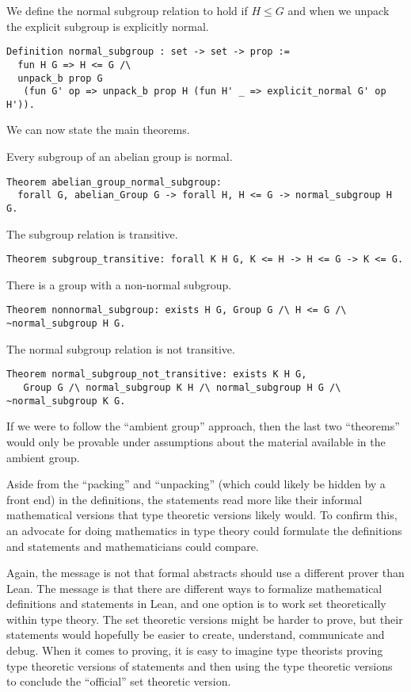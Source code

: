 \documentclass{article}
\begin{document}
We define the normal subgroup relation to hold if $H\leq G$ and when we unpack the explicit subgroup is
explicitly normal.
\begin{verbatim}
Definition normal_subgroup : set -> set -> prop :=
  fun H G => H <= G /\
  unpack_b prop G
   (fun G' op => unpack_b prop H (fun H' _ => explicit_normal G' op H')).
\end{verbatim}

We can now state the main theorems.

Every subgroup of an abelian group is normal.
\begin{verbatim}
Theorem abelian_group_normal_subgroup:
  forall G, abelian_Group G -> forall H, H <= G -> normal_subgroup H G.
\end{verbatim}

The subgroup relation is transitive.
\begin{verbatim}
Theorem subgroup_transitive: forall K H G, K <= H -> H <= G -> K <= G.
\end{verbatim}

There is a group with a non-normal subgroup.
\begin{verbatim}
Theorem nonnormal_subgroup: exists H G, Group G /\ H <= G /\ ~normal_subgroup H G.
\end{verbatim}

The normal subgroup relation is not transitive.
\begin{verbatim}
Theorem normal_subgroup_not_transitive: exists K H G,
   Group G /\ normal_subgroup K H /\ normal_subgroup H G /\ ~normal_subgroup K G.
\end{verbatim}

If we were to follow the ``ambient group'' approach, then the last two ``theorems'' would only
be provable under assumptions about the material available in the ambient group.

Aside from the ``packing'' and ``unpacking'' (which could likely be hidden by a front end)
in the definitions, the statements read more like their informal mathematical versions
that type theoretic versions likely would. To confirm this, an advocate for doing
mathematics in type theory could formulate the definitions and statements
and mathematicians could compare.

Again, the message is not that formal abstracts should use a different prover than Lean.
The message is that there are different ways to formalize mathematical definitions and statements
in Lean, and one option is to work set theoretically within type theory.
The set theoretic versions might be harder to prove, but their statements would hopefully
be easier to create, understand, communicate and debug.
When it comes to proving, it is easy to imagine type theorists proving type theoretic versions
of statements and then using the type theoretic versions to conclude the ``official'' set theoretic version.




\end{document}

